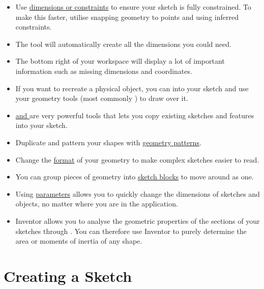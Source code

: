 \begin{summary}
\begin{itemize}
\easydifficulty
\item Use \hyperref[section: Constraints and Dimensions]{dimensions or constraints} to ensure your sketch is fully constrained. To make this faster, utilise snapping geometry to points and using inferred constraints.
\item The \hyperref[subsection: Automatic Dimensions]{} tool will automatically create all the dimensions you could need.
\item The bottom right of your workspace will display a lot of important information such as missing dimensions and coordinates.
\item If you want to recreate a physical object, you can \hyperref[section: Sketch Insert]{} into your sketch and use your geometry tools (most commonly ) to draw over it.
\item \hyperref[subsection: Projecting Geometry]{ and } are very powerful tools that lets you copy existing sketches and features into your sketch.
\item Duplicate and pattern your shapes with \hyperref[section: Geometry Patterns]{geometry patterns}.
\item Change the \hyperref[section: Formatting]{format} of your geometry to make complex sketches easier to read.
\item You can group pieces of geometry into \hyperref[subsection: Sketch Blocks]{sketch blocks} to move around as one.
\item Using \hyperref[section: Parameters]{parameters} allows you to quickly change the dimensions of sketches and objects, no matter where you are in the application.
\item Inventor allows you to analyse the geometric properties of the sections of your sketches through \hyperref[section: More Sketch Options]{}. You can therefore use Inventor to purely determine the area or moments of inertia of any shape.
\end{itemize}
\end{summary}

\section{Creating a Sketch}


